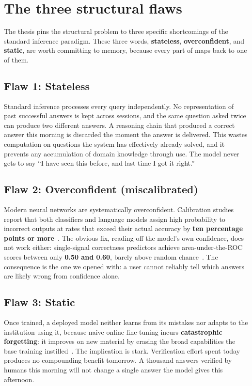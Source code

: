 \section{The three structural flaws}
\label{sec:three-flaws}

The thesis pins the structural problem to three specific shortcomings of the
standard inference paradigm. These three words, \textbf{stateless},
\textbf{overconfident}, and \textbf{static}, are worth committing to memory,
because every part of \caem{} maps back to one of them.

\subsection*{Flaw 1: Stateless}
Standard inference processes every query independently. No representation of
past successful answers is kept across sessions, and the same question asked
twice can produce two different answers. A reasoning chain that produced a
correct answer this morning is discarded the moment the answer is delivered.
This wastes computation on questions the system has effectively already solved,
and it prevents any accumulation of domain knowledge through use. The model
never gets to say ``I have seen this before, and last time I got it right.''

\subsection*{Flaw 2: Overconfident (miscalibrated)}
Modern neural networks are systematically overconfident. Calibration studies
report that both classifiers and language models assign high probability to
incorrect outputs at rates that exceed their actual accuracy by \textbf{ten
percentage points or more}~\cite{pmlr-v70-guo17a, kadavath2022language}. The
obvious fix, reading off the model's own confidence, does not work either:
single-signal correctness predictors achieve area-under-the-ROC scores between
only \textbf{0.50 and 0.60}, barely above random chance~\cite{xiong2023can}.
The consequence is the one we opened with: a user cannot reliably tell which
answers are likely wrong from confidence alone.

\subsection*{Flaw 3: Static}
Once trained, a deployed model neither learns from its mistakes nor adapts to
the institution using it, because naive online fine-tuning incurs
\textbf{catastrophic forgetting}: it improves on new material by erasing the
broad capabilities the base training instilled~\cite{doi:10.1073/pnas.1611835114}.
The implication is stark. Verification effort spent today produces no
compounding benefit tomorrow. A thousand answers verified by humans this morning
will not change a single answer the model gives this afternoon.

